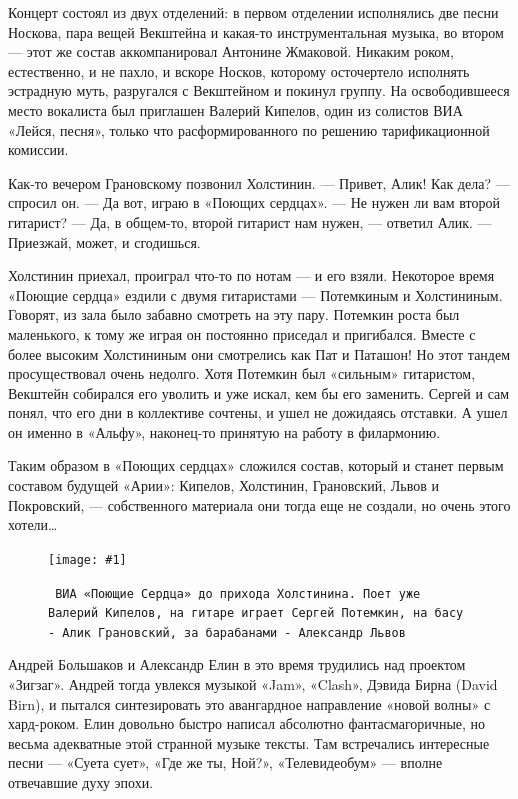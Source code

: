 \documentclass[10pt, twoside]{book}
\newcommand{\myincludegraphics}[1]{\texttt{[image: \#1]}}
\begin{document}
Концерт состоял из двух отделений: в первом отделении исполнялись две песни Носкова, пара вещей Векштейна и какая-то
инструментальная музыка, во втором — этот же состав аккомпанировал Антонине Жмаковой. Никаким роком, естественно, и не
пахло, и вскоре Носков, которому осточертело исполнять эстрадную муть, разругался с Векштейном и покинул группу. На
освободившееся место вокалиста был приглашен Валерий Кипелов, один из солистов ВИА «Лейся, песня», только что
расформированного по решению тарификационной комиссии.

Как-то вечером Грановскому позвонил Холстинин.
— Привет, Алик! Как дела? — спросил он.
— Да вот, играю в «Поющих сердцах».
— Не нужен ли вам второй гитарист?
— Да, в общем-то, второй гитарист нам нужен, — ответил Алик. — Приезжай, может, и сгодишься.

Холстинин приехал, проиграл что-то по нотам — и его взяли. Некоторое время «Поющие сердца» ездили с двумя гитаристами —
Потемкиным и Холстининым. Говорят, из зала было забавно смотреть на эту пару. Потемкин роста был маленького, к тому же
играя он постоянно приседал и пригибался. Вместе с более высоким Холстининым они смотрелись как Пат и Паташон! Но этот
тандем просуществовал очень недолго. Хотя Потемкин был «сильным» гитаристом, Векштейн собирался его уволить и уже искал,
кем бы его заменить. Сергей и сам понял, что его дни в коллективе сочтены, и ушел не дожидаясь отставки. А ушел он
именно в «Альфу», наконец-то принятую на работу в филармонию.

Таким образом в «Поющих сердцах» сложился состав, который и станет первым составом будущей «Арии»: Кипелов, Холстинин,
Грановский, Львов и Покровский, — собственного материала они тогда еще не создали, но очень этого хотели\ldots

\begin{figure}[h]
    \centering
    \myincludegraphics{Image11}
    \caption{\texttt{
        ВИА «Поющие Сердца» до прихода Холстинина. Поет уже Валерий Кипелов, на гитаре играет Сергей Потемкин, на басу -
        Алик Грановский, за барабанами - Александр Львов
    }}
\end{figure}

Андрей Большаков и Александр Елин в это время трудились над проектом «Зигзаг». Андрей тогда увлекся музыкой «Jam»,
«Clash», Дэвида Бирна (David Birn), и пытался синтезировать это авангардное направление «новой волны» с хард-роком. Елин
довольно быстро написал абсолютно фантасмагоричные, но весьма адекватные этой странной музыке тексты. Там встречались
интересные песни — «Суета сует», «Где же ты, Ной?», «Телевидеобум» — вполне отвечавшие духу эпохи.
\end{document}
